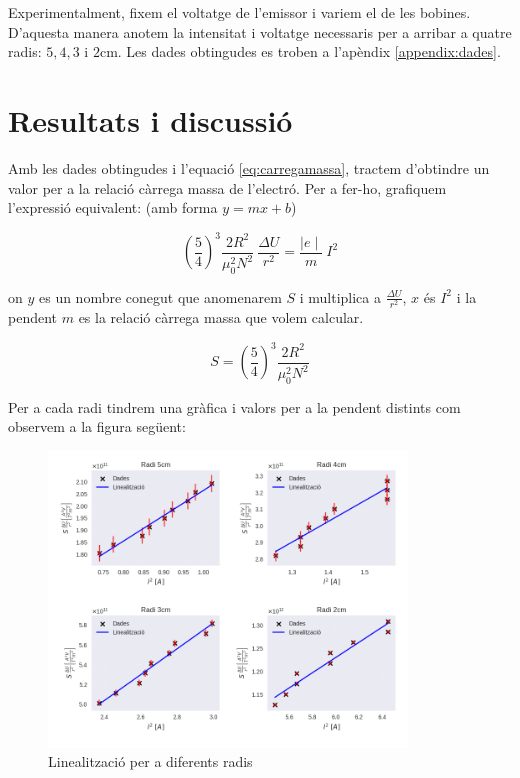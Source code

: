 \documentclass[11pt]{article}
\begin{document}
        \vspace{0.4cm}Experimentalment, fixem el voltatge de l'emissor i variem el de les bobines. D'aquesta manera anotem la intensitat i voltatge necessaris per a arribar a quatre radis: $5,4,3\text{ i }2$cm. Les dades obtingudes es troben a l'apèndix \ref{appendix:dades}.

\clearpage
\section{Resultats i discussió}
    \vspace{0.2cm}Amb les dades obtingudes i l'equació \ref{eq:carregamassa}, tractem d'obtindre un valor per a la relació càrrega massa de l'electró. Per a fer-ho, grafiquem l'expressió equivalent: (amb forma $y=mx + b$)

    \begin{equation}
        \left(\frac{5}{4}\right)^3\frac{2R^2}{\mu_0^2 N^2}\ \frac{\Delta U}{r^2} = \frac{\mid e\mid}{m}\ I^2
        \label{eq:carregamassaLineal}
    \end{equation}

    on $y$ es un nombre conegut que anomenarem $S$ i multiplica a $\frac{\Delta U}{r^2}$, $x$ és $I^2$ i la pendent $m$ es la relació càrrega massa que volem calcular.

    \[S=\left(\frac{5}{4}\right)^3\frac{2R^2}{\mu_0^2 N^2}\]

    \vspace{0.4cm}Per a cada radi tindrem una gràfica i valors per a la pendent distints com observem a la figura següent:

    \begin{figure}[h]
        \centering
        \includegraphics[width=0.85\textwidth]{fotos/4graphs.png}
        \caption{Linealització per a diferents radis}
        \label{fig:4graph}
    \end{figure}
\end{document}
